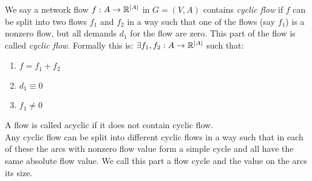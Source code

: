 \begin{definition}
 We say a network flow $f:A\to \mathbb{R}^{|A|}$ in $G=(V,A)$ contains \textit{cyclic flow} if $f$ can be split into two flows 
$f_1$ and $f_2$ in a way such that one of the flows (say $f_1$) is a nonzero flow, but all demands $d_1$ for the flow 
are zero. This part of the flow is called \textit{cyclic flow}. 
Formally this is:
$ \exists f_1, f_2:A\to \mathbb{R}^{|A|}$ such that: 
\begin{enumerate}
 \item $f=f_1+f_2$
 \item $ d_1\equiv 0 $
 \item $ f_1\neq 0$
\end{enumerate}
A flow is called acyclic if it does not contain cyclic flow.\\

Any cyclic flow can be split into different cyclic flows in a way such that in each of these the arcs with nonzero 
flow value form a simple cycle and all have the same absolute flow value. We call this part a flow cycle and the value 
on the arcs its size.

% 


\end{definition}
